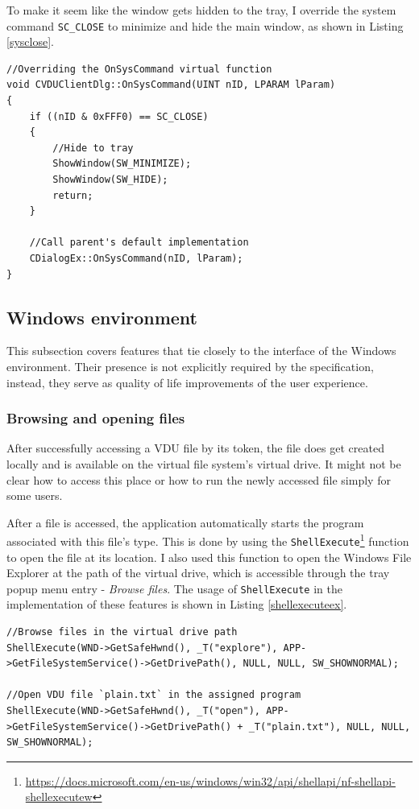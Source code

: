 To make it seem like the window gets hidden to the tray, I override the system command \lstinline{SC_CLOSE} to minimize and hide the main window, as shown in Listing \ref{sysclose}.
\begin{lstlisting}[caption={Overriding system close command to hide the dialog window}, label=sysclose]
//Overriding the OnSysCommand virtual function
void CVDUClientDlg::OnSysCommand(UINT nID, LPARAM lParam)
{
	if ((nID & 0xFFF0) == SC_CLOSE)
	{
	    //Hide to tray
		ShowWindow(SW_MINIMIZE);
		ShowWindow(SW_HIDE);
		return;
	}
	
	//Call parent's default implementation
	CDialogEx::OnSysCommand(nID, lParam);
}
\end{lstlisting}

\subsection{Windows environment}
This subsection covers features that tie closely to the interface of the Windows environment. Their presence is not explicitly required by the specification, instead, they serve as quality of life improvements of the user experience.

\subsubsection{Browsing and opening files}
After successfully accessing a VDU file by its token, the file does get created locally and is available on the virtual file system's virtual drive. It might not be clear how to access this place or how to run the newly accessed file simply for some users.

After a file is accessed, the application automatically starts the program associated with this file's type. This is done by using the \lstinline{ShellExecute}\footnote{\url{https://docs.microsoft.com/en-us/windows/win32/api/shellapi/nf-shellapi-shellexecutew}} function to open the file at its location. I also used this function to open the Windows File Explorer at the path of the virtual drive, which is accessible through the tray popup menu entry - \textit{Browse files}. The usage of \lstinline{ShellExecute} in the implementation of these features is shown in Listing \ref{shellexecuteex}.
\begin{lstlisting}[caption={Examples of using ShellExecute to open and browse files}, label=shellexecuteex]
//Browse files in the virtual drive path
ShellExecute(WND->GetSafeHwnd(), _T("explore"), APP->GetFileSystemService()->GetDrivePath(), NULL, NULL, SW_SHOWNORMAL);
    
//Open VDU file `plain.txt` in the assigned program
ShellExecute(WND->GetSafeHwnd(), _T("open"), APP->GetFileSystemService()->GetDrivePath() + _T("plain.txt"), NULL, NULL, SW_SHOWNORMAL);
\end{lstlisting}

